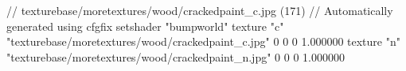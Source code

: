 // texturebase/moretextures/wood/crackedpaint_c.jpg (171)
// Automatically generated using cfgfix
setshader "bumpworld"
texture "c" "texturebase/moretextures/wood/crackedpaint_c.jpg" 0 0 0 1.000000
texture "n" "texturebase/moretextures/wood/crackedpaint_n.jpg" 0 0 0 1.000000
